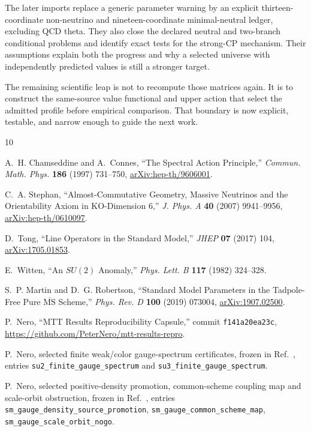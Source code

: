 \documentclass[11pt]{article}
\begin{document}
The later imports replace a generic parameter warning by an explicit thirteen-coordinate
non-neutrino and nineteen-coordinate minimal-neutral ledger, excluding QCD theta.  They also
close the declared neutral and two-branch conditional problems and identify exact tests for
the strong-CP mechanism.  Their assumptions explain both the progress and why a selected
universe with independently predicted values is still a stronger target.

The remaining scientific leap is not to recompute those matrices again.  It is to construct the
same-source value functional and upper action that select the admitted profile before empirical
comparison.  That boundary is now explicit, testable, and narrow enough to guide the next work.

\begin{thebibliography}{10}

A.~H. Chamseddine and A.~Connes,
``The Spectral Action Principle,''
\emph{Commun. Math. Phys.} \textbf{186} (1997) 731--750,
\href{https://arxiv.org/abs/hep-th/9606001}{arXiv:hep-th/9606001}.

C.~A. Stephan,
``Almost-Commutative Geometry, Massive Neutrinos and the Orientability Axiom in KO-Dimension 6,''
\emph{J. Phys. A} \textbf{40} (2007) 9941--9956,
\href{https://arxiv.org/abs/hep-th/0610097}{arXiv:hep-th/0610097}.

D.~Tong,
``Line Operators in the Standard Model,''
\emph{JHEP} \textbf{07} (2017) 104,
\href{https://arxiv.org/abs/1705.01853}{arXiv:1705.01853}.

E.~Witten,
``An $SU(2)$ Anomaly,''
\emph{Phys. Lett. B} \textbf{117} (1982) 324--328.

S.~P. Martin and D.~G. Robertson,
``Standard Model Parameters in the Tadpole-Free Pure $\overline{\mathrm{MS}}$ Scheme,''
\emph{Phys. Rev. D} \textbf{100} (2019) 073004,
\href{https://arxiv.org/abs/1907.02500}{arXiv:1907.02500}.

P.~Nero,
``MTT Results Reproducibility Capsule,'' commit
\texttt{f141a20ea23c},
\url{https://github.com/PeterNero/mtt-results-repro}.

P.~Nero, selected finite weak/color gauge-spectrum certificates, frozen in
Ref.~\cite{MTTResults}, entries \nolinkurl{su2_finite_gauge_spectrum} and
\nolinkurl{su3_finite_gauge_spectrum}.

P.~Nero, selected positive-density promotion, common-scheme coupling map and scale-orbit
obstruction, frozen in Ref.~\cite{MTTResults}, entries
\nolinkurl{sm_gauge_density_source_promotion}, \nolinkurl{sm_gauge_common_scheme_map},
\nolinkurl{sm_gauge_scale_orbit_nogo}.


\end{thebibliography}
\end{document}
